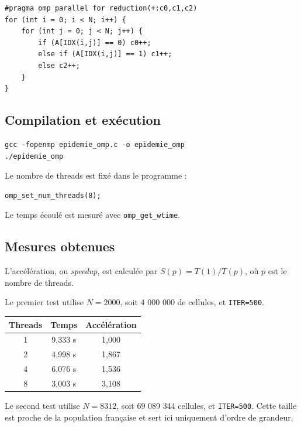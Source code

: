 \documentclass[a4paper,12pt]{article}
\begin{document}
\begin{lstlisting}
#pragma omp parallel for reduction(+:c0,c1,c2)
for (int i = 0; i < N; i++) {
    for (int j = 0; j < N; j++) {
        if (A[IDX(i,j)] == 0) c0++;
        else if (A[IDX(i,j)] == 1) c1++;
        else c2++;
    }
}
\end{lstlisting}

\subsection{Compilation et exécution}

\begin{lstlisting}[numbers=none]
gcc -fopenmp epidemie_omp.c -o epidemie_omp
./epidemie_omp
\end{lstlisting}

Le nombre de threads est fixé dans le programme :

\begin{lstlisting}[numbers=none]
omp_set_num_threads(8);
\end{lstlisting}

Le temps écoulé est mesuré avec \texttt{omp\_get\_wtime}.

\subsection{Mesures obtenues}

L'accélération, ou \textit{speedup}, est calculée par
$S(p)=T(1)/T(p)$, où $p$ est le nombre de threads.

Le premier test utilise $N=2000$, soit 4 000 000 de cellules, et
\texttt{ITER=500}.

\begin{center}
\begin{tabular}{|c|c|c|}
	\hline
	\textbf{Threads} & \textbf{Temps} & \textbf{Accélération} \\ \hline
	1 & 9,333 s & 1,000 \\ \hline
	2 & 4,998 s & 1,867 \\ \hline
	4 & 6,076 s & 1,536 \\ \hline
	8 & 3,003 s & 3,108 \\ \hline
\end{tabular}
\end{center}

Le second test utilise $N=8312$, soit 69 089 344 cellules, et
\texttt{ITER=500}. Cette taille est proche de la population française et sert
ici uniquement d'ordre de grandeur.
\end{document}
